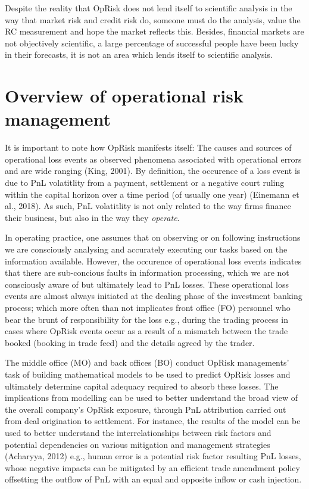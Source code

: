 \documentclass{DissertateUSU}
\begin{document}
Despite the reality that OpRisk does not lend itself to scientific
analysis in the way that market risk and credit risk do, someone must do
the analysis, value the RC measurement and hope the market reflects
this. Besides, financial markets are not objectively scientific, a large
percentage of successful people have been lucky in their forecasts, it
is not an area which lends itself to scientific analysis.

\section{Overview of operational risk management}
\label{sec:Overview of operational risk management}

It is important to note how OpRisk manifests itself: The causes and
sources of operational loss events as observed phenomena associated with
operational errors and are wide ranging (King, 2001). By definition, the
occurence of a loss event is due to PnL volatitlity from a payment,
settlement or a negative court ruling within the capital horizon over a
time period (of usually one year) (Einemann et al., 2018). As such, PnL
volatitlity is not only related to the way firms finance their business,
but also in the way they \emph{operate}.\medskip 

In operating practice, one assumes that on observing or on following
instructions we are consciously analysing and accurately executing our
tasks based on the information available. However, the occurence of
operational loss events indicates that there are sub-concious faults in
information processing, which we are not consciously aware of but
ultimately lead to PnL losses. These operational loss events are almost
always initiated at the dealing phase of the investment banking process;
which more often than not implicates front office (FO) personnel who
bear the brunt of responsibility for the loss e.g., during the trading
process in cases where OpRisk events occur as a result of a mismatch
between the trade booked (booking in trade feed) and the details agreed
by the trader.\medskip

The middle office (MO) and back offices (BO) conduct OpRisk managements'
task of building mathematical models to be used to predict OpRisk losses
and ultimately determine capital adequacy required to absorb these
losses. The implications from modelling can be used to better understand
the broad view of the overall company's OpRisk exposure, through PnL
attribution carried out from deal origination to settlement. For
instance, the results of the model can be used to better understand the
interrelationships between risk factors and potential dependencies on
various mitigation and management strategies (Acharyya, 2012) e.g.,
human error is a potential risk factor resulting PnL losses, whose
negative impacts can be mitigated by an efficient trade amendment policy
offsetting the outflow of PnL with an equal and opposite inflow or cash
injection.\medskip
\end{document}

